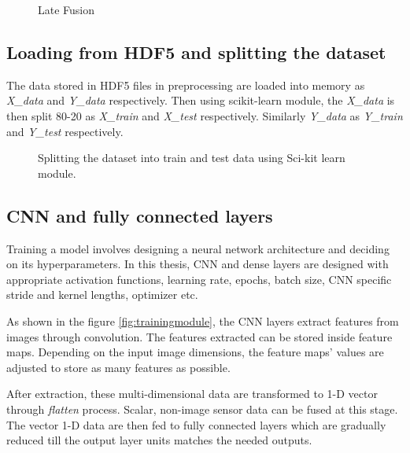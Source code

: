 \begin{figure}[h]
    \centering
    \def\svgwidth{\textwidth}
    
    \caption{Late Fusion}
    \label{fig:latefusion}
\end{figure}


\subsection{Loading from HDF5 and splitting the dataset}
The data stored in HDF5 files in preprocessing are loaded into memory as \textit{X\_data} and
\textit{Y\_data} respectively. Then using scikit-learn module, the \textit{X\_data} is then split 80-20
as \textit{X\_train} and \textit{X\_test} respectively. Similarly \textit{Y\_data} as \textit{Y\_train} and
\textit{Y\_test} respectively.

\begin{wrapfigure}{l}{0.3\textwidth}
	\centering
    \def\svgwidth{0.3\textwidth}
    \caption{Splitting the dataset into train and test data using Sci-kit learn module.}
    \label{fig:splitdata}
\end{wrapfigure}

\subsection{CNN and fully connected layers}

Training a model involves designing a neural network architecture and deciding on its
hyperparameters. In this thesis, CNN and dense layers are designed with appropriate
activation functions, learning rate, epochs, batch size, CNN specific stride and kernel
lengths, optimizer etc.

As shown in the figure \ref{fig:trainingmodule}, the CNN layers extract features from
images through convolution. The features extracted can be stored inside feature maps. Depending on the input image dimensions, the
feature maps' values are adjusted to store as many features as possible.

After extraction, these multi-dimensional data are transformed to 1-D vector through
\textit{flatten} process. Scalar, non-image sensor data can be fused at this stage. The
vector 1-D data are then fed to fully connected layers which are gradually reduced till
the output layer units matches the needed outputs.

